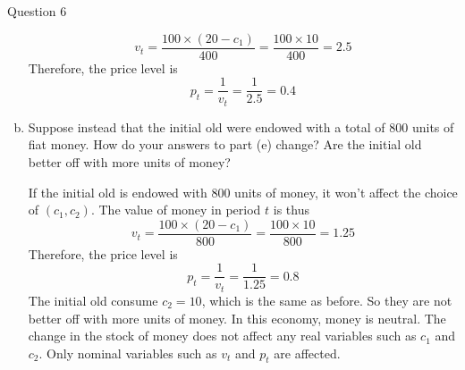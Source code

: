 \documentclass[a4paper]{article}
\newif\IfInSansMode
\numberwithin{equation}{section}
\numberwithin{figure}{section}
\begin{document}
\begin{questionbox}{Question 6}
\begin{enumerate}[(a)]
\begin{explanationbox}
				\[
					v_t = \frac{100\times(20-c_1)}{400}=\frac{100\times10}{400}=2.5
				\]
				Therefore, the price level is
				\[
					p_t = \frac{1}{v_t} = \frac{1}{2.5}=0.4
				\]
			\end{explanationbox}\pagebreak
			\item Suppose instead that the initial old were endowed with a total of 800 units of fiat money. How do your answers to part (e) change? Are the initial old better off with more units of money?
			\begin{explanationbox}
				If the initial old is endowed with 800 units of money, it won't affect the choice of \((c_1,c_2)\).
				The value of money in period \(t\) is thus
				\[
					v_t = \frac{100\times(20-c_1)}{800}=\frac{100\times10}{800}=1.25
				\]
				Therefore, the price level is
				\[
					p_t = \frac{1}{v_t} = \frac{1}{1.25}=0.8
				\]
				The initial old consume \(c_2 = 10\), which is the same as before. So they are not better off with more units of money. In this economy, money is neutral. The change in the stock of money does not affect any real variables such as \( c_1 \) and \( c_2 \). Only nominal variables such as \( v_t \) and \( p_t \) are affected.\
			\end{explanationbox}
		\end{enumerate}
	\end{questionbox}
\end{document}
